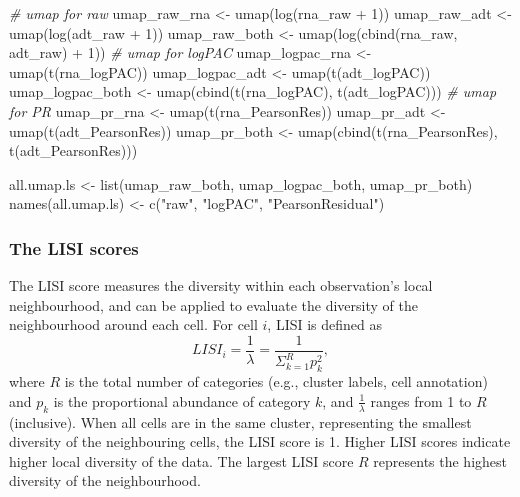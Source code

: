 \documentclass[]{article}
\newcommand{\hlnum}[1]{\textcolor[rgb]{0.816,0.125,0.439}{#1}}%
\newcommand{\hlstr}[1]{\textcolor[rgb]{0.251,0.627,0.251}{#1}}%
\newcommand{\hlcom}[1]{\textcolor[rgb]{0.502,0.502,0.502}{\textit{#1}}}%
\newcommand{\hlstd}[1]{\textcolor[rgb]{0.251,0.251,0.251}{#1}}%
\newenvironment{Shaded}{\begin{myshaded}}{\end{myshaded}}
\newcommand{\DecValTok}[1]{\hlnum{#1}}
\newcommand{\SpecialCharTok}[1]{\hlstr{#1}}
\newcommand{\StringTok}[1]{\hlstr{#1}}
\newcommand{\CommentTok}[1]{\hlcom{#1}}
\newcommand{\OtherTok}[1]{{#1}}
\newcommand{\FunctionTok}[1]{\hlstd{#1}}
\newcommand{\NormalTok}[1]{\hlstd{#1}}
\begin{document}
\begin{Shaded}
\begin{Highlighting}[]
\CommentTok{\# umap for raw}
\NormalTok{umap\_raw\_rna }\OtherTok{\textless{}{-}} \FunctionTok{umap}\NormalTok{(}\FunctionTok{log}\NormalTok{(rna\_raw }\SpecialCharTok{+} \DecValTok{1}\NormalTok{))}
\NormalTok{umap\_raw\_adt }\OtherTok{\textless{}{-}} \FunctionTok{umap}\NormalTok{(}\FunctionTok{log}\NormalTok{(adt\_raw }\SpecialCharTok{+} \DecValTok{1}\NormalTok{))}
\NormalTok{umap\_raw\_both }\OtherTok{\textless{}{-}} \FunctionTok{umap}\NormalTok{(}\FunctionTok{log}\NormalTok{(}\FunctionTok{cbind}\NormalTok{(rna\_raw, adt\_raw) }\SpecialCharTok{+} \DecValTok{1}\NormalTok{))}
\CommentTok{\# umap for logPAC}
\NormalTok{umap\_logpac\_rna }\OtherTok{\textless{}{-}} \FunctionTok{umap}\NormalTok{(}\FunctionTok{t}\NormalTok{(rna\_logPAC))}
\NormalTok{umap\_logpac\_adt }\OtherTok{\textless{}{-}} \FunctionTok{umap}\NormalTok{(}\FunctionTok{t}\NormalTok{(adt\_logPAC))}
\NormalTok{umap\_logpac\_both }\OtherTok{\textless{}{-}} \FunctionTok{umap}\NormalTok{(}\FunctionTok{cbind}\NormalTok{(}\FunctionTok{t}\NormalTok{(rna\_logPAC), }\FunctionTok{t}\NormalTok{(adt\_logPAC)))}
\CommentTok{\# umap for PR}
\NormalTok{umap\_pr\_rna }\OtherTok{\textless{}{-}} \FunctionTok{umap}\NormalTok{(}\FunctionTok{t}\NormalTok{(rna\_PearsonRes))}
\NormalTok{umap\_pr\_adt }\OtherTok{\textless{}{-}} \FunctionTok{umap}\NormalTok{(}\FunctionTok{t}\NormalTok{(adt\_PearsonRes))}
\NormalTok{umap\_pr\_both }\OtherTok{\textless{}{-}} \FunctionTok{umap}\NormalTok{(}\FunctionTok{cbind}\NormalTok{(}\FunctionTok{t}\NormalTok{(rna\_PearsonRes), }\FunctionTok{t}\NormalTok{(adt\_PearsonRes)))}

\NormalTok{all.umap.ls }\OtherTok{\textless{}{-}} \FunctionTok{list}\NormalTok{(umap\_raw\_both, umap\_logpac\_both, umap\_pr\_both)}
\FunctionTok{names}\NormalTok{(all.umap.ls) }\OtherTok{\textless{}{-}} \FunctionTok{c}\NormalTok{(}\StringTok{"raw"}\NormalTok{, }\StringTok{"logPAC"}\NormalTok{, }\StringTok{"PearsonResidual"}\NormalTok{)}
\end{Highlighting}
\end{Shaded}

\subsubsection{The LISI scores}\label{the-lisi-scores}

The LISI score measures the diversity within each observation's local neighbourhood, and can be applied to evaluate the diversity of the neighbourhood around each cell.
For cell \(i\), LISI is defined as
\[
  LISI_i=\frac{1}{\lambda}=\frac{1}{\Sigma^R_{k=1}p^2_k},
\]
where \(R\) is the total number of categories (e.g., cluster labels, cell annotation) and \(p_k\) is the proportional abundance of category \(k\), and \(\frac{1}{\lambda}\) ranges from 1 to \(R\) (inclusive). When all cells are in the same cluster, representing the smallest diversity of the neighbouring cells, the LISI score is 1. Higher LISI scores indicate higher local diversity of the data. The largest LISI score \(R\) represents the highest diversity of the neighbourhood.
\end{document}
